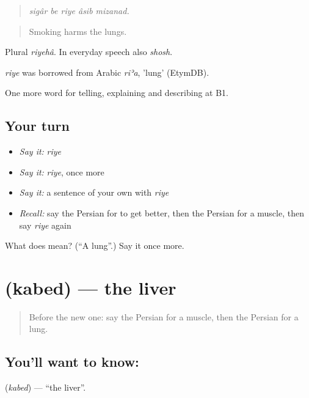 \begin{quote}
\emph{sigâr be riye âsib mizanad.}
\end{quote}

\begin{quote}
Smoking harms the lungs.
\end{quote}

Plural \emph{riyehâ}. In everyday speech also \emph{shosh}.

\begin{cousinweb}
\emph{riye} was borrowed from Arabic \emph{riʾa}, 'lung' (EtymDB).
\end{cousinweb}

\begin{grammarlens}[title={What you've built}]
One more word for telling, explaining and describing at B1.
\end{grammarlens}

\subsection*{Your turn}
\begin{itemize}
\raggedright
  \item \emph{Say it:} \emph{riye}
  \item \emph{Say it:} \emph{riye}, once more
  \item \emph{Say it:} a sentence of your own with \emph{riye}
  \item \emph{Recall:} say the Persian for to get better, then the Persian for a muscle, then say \emph{riye} again
\end{itemize}

\begin{tcolorbox}[breakable,colback=teal!4,colframe=teal!35!black,title={Before you move on}]
What does  mean? (\textquotedblleft{}A lung\textquotedblright{}.) Say it once more.
\end{tcolorbox}
\section[\texorpdfstring{\fa{کبد} (kabed)}{کبد (kabed)}]{ (kabed) — the liver}

\label{lesson:FA-C495-kabed}



\begin{quote}
Before the new one: say the Persian for a muscle, then the Persian for a lung.
\end{quote}

\subsection*{You'll want to know: }
\textbf{} (\emph{kabed}) — \textquotedblleft{}the liver\textquotedblright{}.

